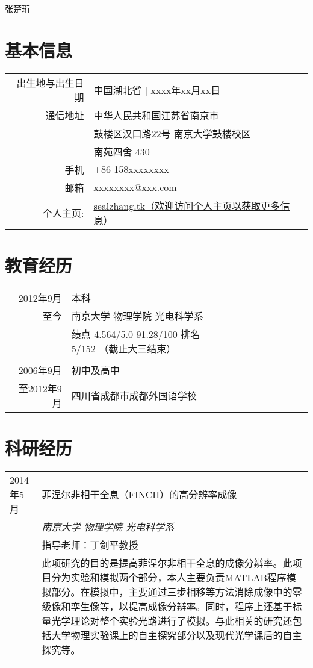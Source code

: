 \documentclass[CHN]{Sketch}
\begin{document}
\par{\centering
		{%
		\Huge \textsc{张楚珩} }
		\bigskip\par}



\section{基本信息}

\begin{tabular}{rl}
    \textsc{出生地与出生日期} & 中国湖北省  | xxxx年xx月xx日 \\
    \textsc{通信地址}   & 中华人民共和国江苏省南京市 \\
                        & 鼓楼区汉口路22号 南京大学鼓楼校区\\
                        & 南苑四舍 430\\
    \textsc{手机}     & +86 158xxxxxxxx\\
    \textsc{邮箱}     & xxxxxxxx@xxx.com \\
    \textsc{个人主页:}  & \href{http://sealzhang.tk}{sealzhang.tk（欢迎访问个人主页以获取更多信息）} 
\end{tabular}

\section{教育经历}
\begin{tabular}{rl}	
2012年9月 & 本科\\
至今 & 南京大学 物理学院 光电科学系\\
&\normalsize \textsc{\underline{绩点}} 4.564/5.0 91.28/100 \textsc{\underline{排名}} 5/152 （截止大三结束）\\
\\
2006年9月 & 初中及高中\\
至2012年9月 & 四川省成都市成都外国语学校\\

\end{tabular}

\section{科研经历}
\begin{tabular}{p{2cm}|p{12cm}}

\textsc{2014年5月} 
& 菲涅尔非相干全息（FINCH）的高分辨率成像\\
&\emph{南京大学 物理学院 光电科学系}\\
& 指导老师：丁剑平教授 \\
&\footnotesize{此项研究的目的是提高菲涅尔非相干全息的成像分辨率。此项目分为实验和模拟两个部分，本人主要负责MATLAB程序模拟部分。在模拟中，主要通过三步相移等方法消除成像中的零级像和孪生像等，以提高成像分辨率。同时，程序上还基于标量光学理论对整个实验光路进行了模拟。与此相关的研究还包括大学物理实验课上的自主探究部分以及现代光学课后的自主探究等。}\\
\multicolumn{2}{c}{} \\
\end{tabular}
\end{document}
